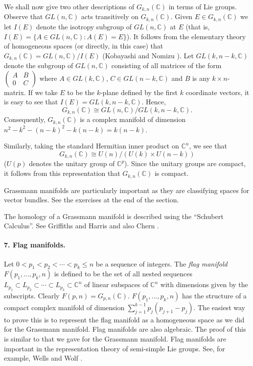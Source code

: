 We shall now give two other descriptions of $G_{k,n}(\mathbb C)$ in terms of Lie groups. Observe that $GL(n,\mathbb C)$ acts transitively on $G_{k,n}(\mathbb C)$. Given $E\in G_{k,n}(\mathbb C)$ we let $I(E)$ denote the isotropy subgroup of $GL(n,\mathbb C)$ at $E$ (that is, $I(E)=\{A\in GL(n,\mathbb C):A(E)=E\}$). It follows from the elementary theory of homogeneous spaces (or directly, in this case) that $G_{k,n}(\mathbb C)=GL(n,\mathbb C)/I(E)$ (Kobayashi and Nomizu \cite{bib:I:kobayashi-s-and-nomizu-k:2}). Let $GL(k,n-k,\mathbb C)$ denote the subgroup of $GL(n,\mathbb C)$ consisting of all matrices of the form $\begin{pmatrix}A&B\\0&C\end{pmatrix}$ where $A\in GL(k,\mathbb C)$, $C\in GL(n-k,\mathbb C)$ and $B$ is any $k\times n$-matrix. If we take $E$ to be the $k$-plane defined by the first $k$ coordinate vectors,
it is easy to see that $I(E)=GL(k,n-k,\mathbb C)$. Hence,
\[
G_{k,n}(\mathbb C)\cong GL(n,\mathbb C)/GL(k,n-k,\mathbb C).
\]
Consequently, $G_{k,n}(\mathbb C)$ is a complex manifold of dimension $n^2-k^2-(n-k)^2-k(n-k)=k(n-k)$.

Similarly, taking the standard Hermitian inner product on $\mathbb C^n$, we see that
\[
G_{k,n}(\mathbb C)\cong U(n)/(U(k)\times U(n-k))
\]
($U(p)$ denotes the unitary group of $\mathbb C^p$). Since the unitary groups are compact, it follows from this representation that $G_{k,n}(\mathbb C)$ is compact.

Grassmann manifolds are particularly important as they are classifying spaces for vector bundles. See the exercises at the end of the section.

The homology of a Grassmann manifold is described using the ``Schubert Calculus''. See Griffiths and Harris \cite{bib:I:griffiths-p-and-harris-j:1} and also Chern \cite{bib:I:chern-s-s:1}.

\paragraph*{7. Flag manifolds.} Let $0<p_1<p_2<\cdots<p_k\leq n$ be a sequence of integers. The \emph{flag manifold} $F(p_1,\ldots,p_k,n)$ is defined to be the set of all nested sequences $L_{p_1}\subset L_{p_2}\subset\cdots\subset L_{p_k}\subset\mathbb C^n$ of linear subspaces of $\mathbb C^n$ with dimensions given by the subscripts. Clearly $F(p,n)=G_{p,n}(\mathbb C)$. $F(p_1,\ldots,p_k,n)$ has the structure of a compact complex manifold of dimension $\sum_{j=1}^{k-1}p_j(p_{j+1}-p_j)$. The easiest way to prove this is to represent the flag manifold as a homogeneous space as we did for the Grassmann manifold. Flag manifolds are also algebraic. The proof of this is similar to that we gave for the Grassmann manifold. Flag manifolds are important in the representation theory of semi-simple Lie groups. See, for example, Wells and Wolf \cite{bib:I:wells-r-o-and-wolf-j-a:1}.

